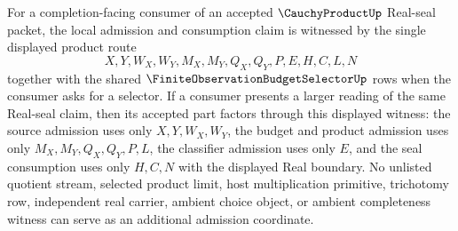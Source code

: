 \begin{lemma}
\label{lem:cauchy-product-real-seal-selector-minimal-witness}
For a completion-facing consumer of an accepted $\CauchyProductUp$ Real-seal packet, the local admission and consumption claim is witnessed by the single displayed product route
$$
X,Y,W_X,W_Y,M_X,M_Y,Q_X,Q_Y,P,E,H,C,L,N
$$
together with the shared $\FiniteObservationBudgetSelectorUp$ rows when the consumer asks for a selector. If a consumer presents a larger reading of the same Real-seal claim, then its accepted part factors through this displayed witness: the source admission uses only $X,Y,W_X,W_Y$, the budget and product admission uses only $M_X,M_Y,Q_X,Q_Y,P,L$, the classifier admission uses only $E$, and the seal consumption uses only $H,C,N$ with the displayed Real boundary. No unlisted quotient stream, selected product limit, host multiplication primitive, trichotomy row, independent real carrier, ambient choice object, or ambient completeness witness can serve as an additional admission coordinate.
\end{lemma}
